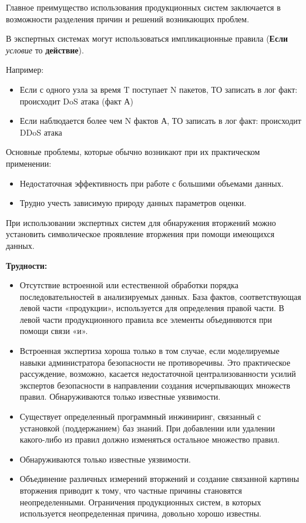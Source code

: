 Главное преимущество использования продукционных систем заключается в возможности разделения причин и
решений возникающих проблем.

В экспертных системах могут использоваться импликационные правила (\textbf{Если} \textit{условие} то
\textbf{действие}).

Например:
\begin{itemize}
	\item Если с одного узла за время T поступает N пакетов, ТО записать в лог факт:
	происходит DoS атака (факт А)

	\item Если наблюдается более чем N фактов А, ТО записать в лог факт: происходит DDoS атака
\end{itemize}

Основные проблемы, которые обычно возникают при их практическом применении:
\begin{itemize}
    \item Недостаточная эффективность при работе с большими объемами данных.
    \item Трудно учесть зависимую природу данных параметров оценки.
\end{itemize}

При использовании экспертных систем для обнаружения вторжений можно установить символическое
проявление вторжения при помощи имеющихся данных.

\textbf{Трудности:}
\begin{itemize}
    \item Отсутствие встроенной или естественной обработки порядка последовательностей в анализируемых
    данных. База фактов, соответствующая левой части «продукции», используется для определения правой
    части. В левой части продукционного правила все элементы объединяются при помощи связи «и».
    \item Встроенная экспертиза хороша только в том случае, если моделируемые навыки администратора
    безопасности не противоречивы. Это практическое рассуждение, возможно, касается
    недостаточной централизованности усилий экспертов безопасности в направлении создания
    исчерпывающих множеств правил. Обнаруживаются только известные уязвимости.
    \item Существует определенный программный инжиниринг, связанный с установкой (поддержанием) баз знаний.
    При добавлении или удалении какого-либо из правил должно изменяться остальное множество правил.
    \item Обнаруживаются только известные уязвимости.
    \item Объединение различных измерений вторжений и создание связанной картины вторжения приводит к
    тому, что частные причины становятся неопределенными. Ограничения продукционных систем, в
    которых используется неопределенная причина, довольно хорошо известны.
\end{itemize}

